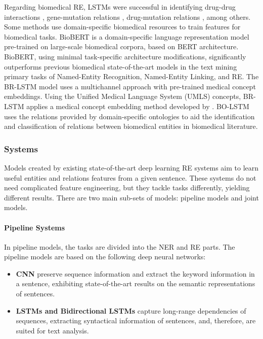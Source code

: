 Regarding biomedical RE, LSTMs were successful in identifying drug-drug interactions \citep{wang2017dependency}, gene-mutation relations \citep{song2018n}, drug-mutation relations \citep{peng2017cross}, among others. Some methods use domain-specific biomedical resources to train features for biomedical tasks. BioBERT \citep{lee2020biobert} is a domain-specific language representation model pre-trained on large-scale biomedical corpora, based on BERT \citep{devlin2019bert} architecture. BioBERT, using minimal task-specific architecture modifications, significantly outperforms previous biomedical state-of-the-art models in the text mining primary tasks of Named-Entity Recognition, Named-Entity Linking, and RE. The BR-LSTM \citep{xu2018leveraging} model uses a multichannel approach with pre-trained medical concept embeddings. Using the Unified Medical Language System (UMLS) concepts, BR-LSTM applies a medical concept embedding method developed by \cite{de2014medical}. BO-LSTM \citep{lamurias2019bo} uses the relations provided by domain-specific ontologies to aid the identification and classification of relations between biomedical entities in biomedical literature. 

\hypertarget{2.4.4}{\subsubsection{Systems}}

Models created by existing state-of-the-art deep learning RE systems aim to learn useful entities and relations features from a given sentence. These systems do not need complicated feature engineering, but they tackle tasks differently, yielding different results. There are two main sub-sets of models: pipeline models and joint models. 

\paragraph{Pipeline Systems}

In pipeline models, the tasks are divided into the NER and RE parts. The pipeline models are based on the following deep neural networks:

\begin{itemize}
    \item \textbf{CNN} preserve sequence information and extract the keyword information in a sentence, exhibiting state-of-the-art results on the semantic representations of sentences. 
    \item \textbf{LSTMs and Bidirectional LSTMs} capture long-range dependencies of sequences, extracting syntactical information of sentences, and, therefore, are suited for text analysis. 
\end{itemize}

